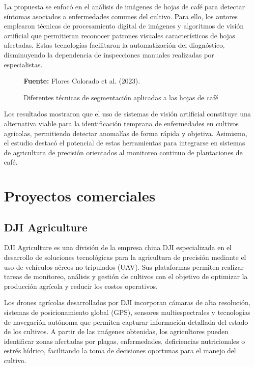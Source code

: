 La propuesta se enfocó en el análisis de imágenes de hojas de café para detectar síntomas asociados a enfermedades comunes del cultivo. Para ello, los autores emplearon técnicas de procesamiento digital de imágenes y algoritmos de visión artificial que permitieran reconocer patrones visuales característicos de hojas afectadas. Estas tecnologías facilitaron la automatización del diagnóstico, disminuyendo la dependencia de inspecciones manuales realizadas por especialistas.

\begin{figure}[H]
    \centering
    \caption{Diferentes técnicas de segmentación aplicadas a las hojas de café}
    \label{fig:1_1_9}
    \vspace{0.2cm}
    \footnotesize \textbf{Fuente:} Flores Colorado et al. (2023).
\end{figure}

Los resultados mostraron que el uso de sistemas de visión artificial constituye una alternativa viable para la identificación temprana de enfermedades en cultivos agrícolas, permitiendo detectar anomalías de forma rápida y objetiva. Asimismo, el estudio destacó el potencial de estas herramientas para integrarse en sistemas de agricultura de precisión orientados al monitoreo continuo de plantaciones de café.



\section{Proyectos comerciales}

\subsection{DJI Agriculture}

DJI Agriculture es una división de la empresa china DJI especializada en el desarrollo de soluciones tecnológicas para la agricultura de precisión mediante el uso de vehículos aéreos no tripulados (UAV). Sus plataformas permiten realizar tareas de monitoreo, análisis y gestión de cultivos con el objetivo de optimizar la producción agrícola y reducir los costos operativos.

Los drones agrícolas desarrollados por DJI incorporan cámaras de alta resolución, sistemas de posicionamiento global (GPS), sensores multiespectrales y tecnologías de navegación autónoma que permiten capturar información detallada del estado de los cultivos. A partir de las imágenes obtenidas, los agricultores pueden identificar zonas afectadas por plagas, enfermedades, deficiencias nutricionales o estrés hídrico, facilitando la toma de decisiones oportunas para el manejo del cultivo.

